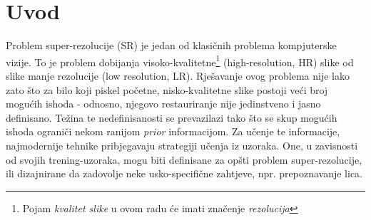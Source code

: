 \documentclass[12pt]{report}
\numberwithin{equation}{section}
\begin{document}
{
{} %
}
\titlep
\prvunutr



\apstrakt
\apstrakten


\tableofcontents
\afterpreface

\doublespacing








\listoffigures 
 
\listoftables 

\chapter{Uvod}\label{ch1}


Problem super-rezolucije (SR) je jedan od klasičnih problema kompjuterske vizije. To je problem dobijanja visoko-kvalitetne\footnote{Pojam \textit{kvalitet slike} u ovom radu će imati značenje \textit{rezolucija}} (high-resolution, HR) slike od slike manje rezolucije (low resolution, LR). Rješavanje ovog problema nije lako zato što za bilo koji piskel početne, nisko-kvalitetne slike postoji veći broj mogućih ishoda - odnosno, njegovo restauriranje nije jedinstveno i jasno definisano. Težina te nedefinisanosti se prevazilazi tako što se skup mogućih ishoda ograniči nekom ranijom \textit{prior} informacijom. Za učenje te informacije, najmodernije tehnike pribjegavaju strategiji učenja iz uzoraka.  One, u zavisnosti od svojih trening-uzoraka, mogu biti definisane za opšti problem super-rezolucije, ili dizajnirane da zadovolje neke usko-specifične zahtjeve, npr. prepoznavanje lica.     

\end{document}
